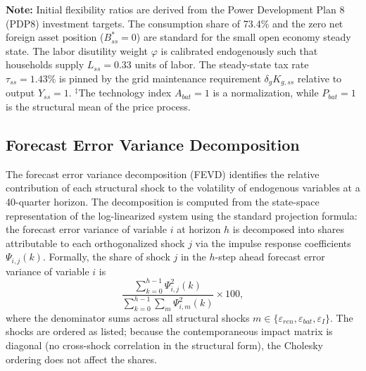 \begin{table}[H]
\begin{tabular}{l c p{6.5cm}}
			\bottomrule
		\end{tabular}
		\vspace{0.2cm}
		\parbox{\textwidth}{\footnotesize \textbf{Note:} Initial flexibility ratios are derived from the Power Development Plan 8 (PDP8) investment targets. The consumption share of 73.4\% and the zero net foreign asset position ($B^*_{ss} = 0$) are standard for the small open economy steady state. The labor disutility weight $\varphi$ is calibrated endogenously such that households supply $L_{ss} = 0.33$ units of labor. The steady-state tax rate $\tau_{ss}=1.43\%$ is pinned by the grid maintenance requirement $\delta_g K_{g,ss}$ relative to output $Y_{ss}=1$. $^\ddagger$The technology index $A_{bat} = 1$ is a normalization, while $P_{bat} = 1$ is the structural mean of the price process.}
	\end{table}


\subsection{Forecast Error Variance Decomposition} \label{app:fevd}

The forecast error variance decomposition (FEVD) identifies the relative contribution of each structural shock to the volatility of endogenous variables at a 40-quarter horizon. The decomposition is computed from the state-space representation of the log-linearized system using the standard projection formula: the forecast error variance of variable $i$ at horizon $h$ is decomposed into shares attributable to each orthogonalized shock $j$ via the impulse response coefficients $\Psi_{i,j}(k)$. Formally, the share of shock $j$ in the $h$-step ahead forecast error variance of variable $i$ is
\begin{equation}
\frac{\sum_{k=0}^{h-1}\Psi_{i,j}^2(k)}{\sum_{k=0}^{h-1}\sum_{m}\Psi_{i,m}^2(k)} \times 100,
\end{equation}
where the denominator sums across all structural shocks $m \in \{\varepsilon_{ren}, \varepsilon_{bat}, \varepsilon_I\}$. The shocks are ordered as listed; because the contemporaneous impact matrix is diagonal (no cross-shock correlation in the structural form), the Cholesky ordering does not affect the shares.

